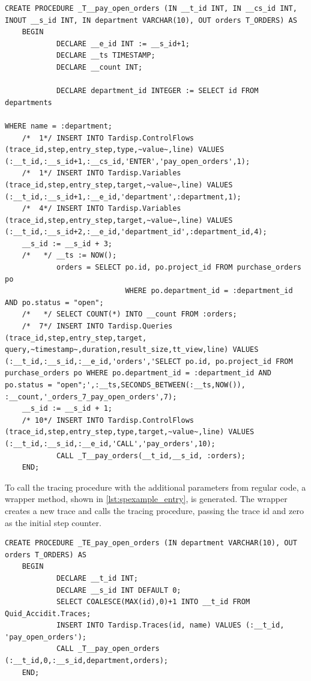 \begin{lstlisting}[language=HanaSQL,float,caption={Example procedure with tracing code.},label=lst:spexample_tracing,firstnumber=1,stepnumber=5]
	CREATE PROCEDURE _T__pay_open_orders (IN __t_id INT, IN __cs_id INT, INOUT __s_id INT, IN department VARCHAR(10), OUT orders T_ORDERS) AS
	BEGIN
			DECLARE __e_id INT := __s_id+1;
			DECLARE __ts TIMESTAMP;
			DECLARE __count INT;

			DECLARE department_id INTEGER := SELECT id FROM departments 
																			 WHERE name = :department;
	/*  1*/ INSERT INTO Tardisp.ControlFlows (trace_id,step,entry_step,type,~value~,line) VALUES (:__t_id,:__s_id+1,:__cs_id,'ENTER','pay_open_orders',1);
	/*  1*/ INSERT INTO Tardisp.Variables (trace_id,step,entry_step,target,~value~,line) VALUES (:__t_id,:__s_id+1,:__e_id,'department',:department,1);
	/*  4*/ INSERT INTO Tardisp.Variables (trace_id,step,entry_step,target,~value~,line) VALUES (:__t_id,:__s_id+2,:__e_id,'department_id',:department_id,4);
	__s_id := __s_id + 3;
	/*   */ __ts := NOW();
			orders = SELECT po.id, po.project_id FROM purchase_orders po
							WHERE po.department_id = :department_id AND po.status = "open";
	/*   */ SELECT COUNT(*) INTO __count FROM :orders;
	/*  7*/ INSERT INTO Tardisp.Queries (trace_id,step,entry_step,target, query,~timestamp~,duration,result_size,tt_view,line) VALUES (:__t_id,:__s_id,:__e_id,'orders','SELECT po.id, po.project_id FROM purchase_orders po WHERE po.department_id = :department_id AND po.status = "open";',:__ts,SECONDS_BETWEEN(:__ts,NOW()), :__count,'_orders_7_pay_open_orders',7);
	__s_id := __s_id + 1;
	/* 10*/ INSERT INTO Tardisp.ControlFlows (trace_id,step,entry_step,type,target,~value~,line) VALUES (:__t_id,:__s_id,:__e_id,'CALL','pay_orders',10);
			CALL _T__pay_orders(__t_id,__s_id, :orders);
	END;
\end{lstlisting}

To call the tracing procedure with the additional parameters from regular code, a wrapper method, shown in \cref{lst:spexample_entry}, is generated.
The wrapper creates a new trace and calls the tracing procedure, passing the trace id and zero as the initial step counter.

\begin{lstlisting}[language=HanaSQL,float,caption={Example procedure with tracing code.},label=lst:spexample_entry,firstnumber=1,stepnumber=5]
	CREATE PROCEDURE _TE_pay_open_orders (IN department VARCHAR(10), OUT orders T_ORDERS) AS
	BEGIN
			DECLARE __t_id INT;
			DECLARE __s_id INT DEFAULT 0;
			SELECT COALESCE(MAX(id),0)+1 INTO __t_id FROM Quid_Accidit.Traces;
			INSERT INTO Tardisp.Traces(id, name) VALUES (:__t_id, 'pay_open_orders');
			CALL _T__pay_open_orders (:__t_id,0,:__s_id,department,orders);
	END;
\end{lstlisting}

